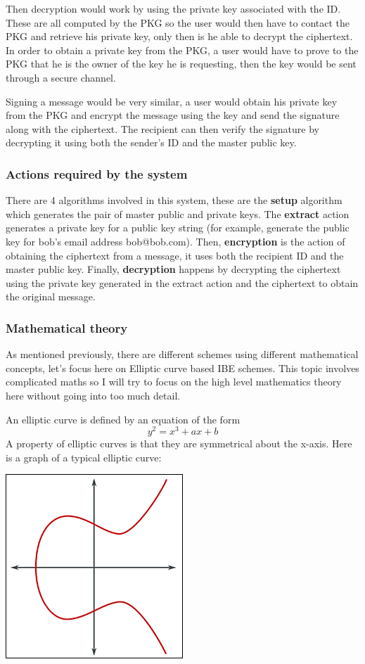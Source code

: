 \documentclass[conference]{IEEEtran}
\begin{document}
Then decryption would work by using the private key associated with the ID. These are all 
computed by the PKG so the user would then have to contact the PKG and retrieve his private key,
only then is he able to decrypt the ciphertext. In order to obtain a private key from the PKG, a user 
would have to prove to the PKG that he is the owner of the key he is requesting, then the key would be sent 
through a secure channel.


Signing a message would be very similar, a user would obtain his private key from the PKG
and encrypt the message using the key and send the signature along with the ciphertext.
The recipient can then verify the signature by decrypting it using both the sender's ID and the 
master public key.


\subsubsection{Actions required by the system}
There are 4 algorithms involved in this system, these are
the \textbf{setup} algorithm which generates the pair of master public and private
keys. The \textbf{extract} action generates a private key for a public key string (for example,
generate the public key for bob's email address bob@bob.com).
Then, \textbf{encryption} is the action of obtaining the ciphertext from a message, it uses both the 
recipient ID and the master public key. Finally, \textbf{decryption} happens by decrypting the ciphertext 
using the private key generated in the extract action and the ciphertext to obtain the original message.


\subsubsection{Mathematical theory}
As mentioned previously, there are different schemes using different mathematical concepts,
let's focus here on Elliptic curve based IBE schemes. This topic involves complicated maths so 
I will try to focus on the high level mathematics theory here without 
going into too much detail.


An elliptic curve is defined by an equation of the form 
\begin{equation*}
    y^2 = x^3 + ax + b
\end{equation*}
A property of elliptic curves is that they are symmetrical about the x-axis. Here is 
a graph of a typical elliptic curve:
\begin{center}
    \includegraphics[scale=0.5]{ecurve}
\end{center}
\end{document}
